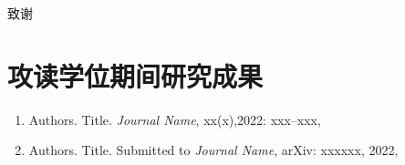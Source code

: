 \documentclass[type=doctor]{fduthesis}
\begin{document}
\frontmatter

\tableofcontents





\mainmatter
%   
%   
%   









\appendix



\backmatter




\printbibliography
\renewcommand{\bibname}{参考文献}

\begin{acknowledgements}
  致谢
\end{acknowledgements}


\chapter*{攻读学位期间研究成果}
\begin{enumerate}
\item Authors. Title. \textit{Journal Name}, xx(x),2022: xxx–xxx,
\item Authors. Title. Submitted to \textit{Journal Name}, arXiv: xxxxxx, 2022,
\end{enumerate}
\end{document}
